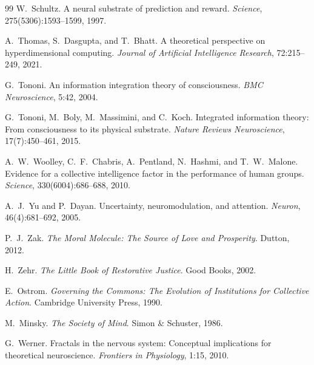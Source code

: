 \documentclass[12pt]{book}
\begin{document}
\begin{thebibliography}{99}
W.~Schultz.
\newblock A neural substrate of prediction and reward.
\newblock \textit{Science}, 275(5306):1593--1599, 1997.

A.~Thomas, S.~Dasgupta, and T.~Bhatt.
\newblock A theoretical perspective on hyperdimensional computing.
\newblock \textit{Journal of Artificial Intelligence Research}, 72:215--249, 2021.

G.~Tononi.
\newblock An information integration theory of consciousness.
\newblock \textit{BMC Neuroscience}, 5:42, 2004.

G.~Tononi, M.~Boly, M.~Massimini, and C.~Koch.
\newblock Integrated information theory: From consciousness to its physical substrate.
\newblock \textit{Nature Reviews Neuroscience}, 17(7):450--461, 2015.

A.~W.~Woolley, C.~F.~Chabris, A.~Pentland, N.~Hashmi, and T.~W.~Malone.
\newblock Evidence for a collective intelligence factor in the performance of human groups.
\newblock \textit{Science}, 330(6004):686--688, 2010.

A.~J.~Yu and P.~Dayan.
\newblock Uncertainty, neuromodulation, and attention.
\newblock \textit{Neuron}, 46(4):681--692, 2005.

P.~J.~Zak.
\newblock \textit{The Moral Molecule: The Source of Love and Prosperity}.
\newblock Dutton, 2012.

H.~Zehr.
\newblock \textit{The Little Book of Restorative Justice}.
\newblock Good Books, 2002.

E.~Ostrom.
\newblock \textit{Governing the Commons: The Evolution of Institutions for Collective Action}.
\newblock Cambridge University Press, 1990.

M.~Minsky.
\newblock \textit{The Society of Mind}.
\newblock Simon \& Schuster, 1986.

G.~Werner.
\newblock Fractals in the nervous system: Conceptual implications for theoretical neuroscience.
\newblock \textit{Frontiers in Physiology}, 1:15, 2010.

\end{thebibliography}
\end{document}
